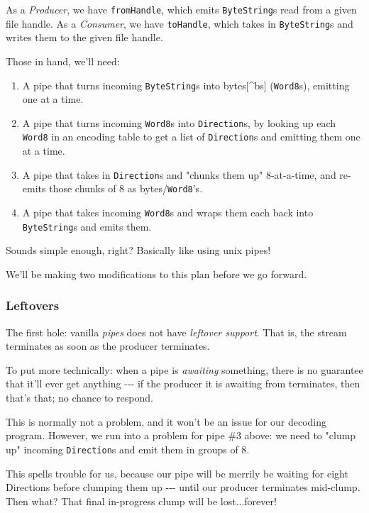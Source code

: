 \documentclass[]{article}
\begin{document}
As a \emph{Producer}, we have \texttt{fromHandle}, which emits
\texttt{ByteString}s read from a given file handle. As a \emph{Consumer}, we
have \texttt{toHandle}, which takes in \texttt{ByteString}s and writes them to
the given file handle.

Those in hand, we'll need:

\begin{enumerate}
\tightlist
\item
  A pipe that turns incoming \texttt{ByteString}s into bytes{[}\^{}bs{]}
  (\texttt{Word8}s), emitting one at a time.
\item
  A pipe that turns incoming \texttt{Word8}s into \texttt{Direction}s, by
  looking up each \texttt{Word8} in an encoding table to get a list of
  \texttt{Direction}s and emitting them one at a time.
\item
  A pipe that takes in \texttt{Direction}s and "chunks them up" 8-at-a-time, and
  re-emits those chunks of 8 as bytes/\texttt{Word8}'s.
\item
  A pipe that takes incoming \texttt{Word8}s and wraps them each back into
  \texttt{ByteString}s and emits them.
\end{enumerate}

Sounds simple enough, right? Basically like using unix pipes!

We'll be making two modifications to this plan before we go forward.

\subsubsection{Leftovers}

The first hole: vanilla \emph{pipes} does not have \emph{leftover support}. That
is, the stream terminates as soon as the producer terminates.

To put more technically: when a pipe is \emph{awaiting} something, there is no
guarantee that it'll ever get anything -\/-\/- if the producer it is awaiting
from terminates, then that's that; no chance to respond.

This is normally not a problem, and it won't be an issue for our decoding
program. However, we run into a problem for pipe \#3 above: we need to "clump
up" incoming \texttt{Direction}s and emit them in groups of 8.

This spells trouble for us, because our pipe will be merrily be waiting for
eight Directions before clumping them up -\/-\/- until our producer terminates
mid-clump. Then what? That final in-progress clump will be lost...forever!
\end{document}
